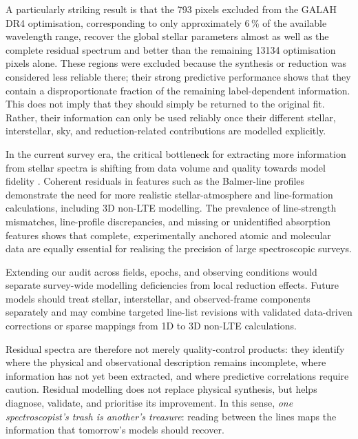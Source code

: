 \documentclass[twocolumn,apj,numberedappendix,appendixfloats]{openjournal}
\begin{document}
A particularly striking result is that the 793 pixels excluded from the GALAH DR4 optimisation, corresponding to only approximately $6\,\mathrm{\%}$ of the available wavelength range, recover the global stellar parameters almost as well as the complete residual spectrum and better than the remaining 13134 optimisation pixels alone. These regions were excluded because the synthesis or reduction was considered less reliable there; their strong predictive performance shows that they contain a disproportionate fraction of the remaining label-dependent information. This does not imply that they should simply be returned to the original fit. Rather, their information can only be used reliably once their different stellar, interstellar, sky, and reduction-related contributions are modelled explicitly.

In the current survey era, the critical bottleneck for extracting more information from stellar spectra is shifting from data volume and quality towards model fidelity \citep{Xiang2019,Saydjari2023,Buder2025b,Storm2026,Casey2026}. Coherent residuals in features such as the Balmer-line profiles demonstrate the need for more realistic stellar-atmosphere and line-formation calculations, including 3D non-LTE modelling. The prevalence of line-strength mismatches, line-profile discrepancies, and missing or unidentified absorption features shows that complete, experimentally anchored atomic and molecular data are equally essential for realising the precision of large spectroscopic surveys.

Extending our audit across fields, epochs, and observing conditions would separate survey-wide modelling deficiencies from local reduction effects. Future models should treat stellar, interstellar, and observed-frame components separately and may combine targeted line-list revisions with validated data-driven corrections or sparse mappings from 1D to 3D non-LTE calculations.

Residual spectra are therefore not merely quality-control products: they identify where the physical and observational description remains incomplete, where information has not yet been extracted, and where predictive correlations require caution. Residual modelling does not replace physical synthesis, but helps diagnose, validate, and prioritise its improvement. In this sense, \textit{one spectroscopist's trash is another's treasure}: reading between the lines maps the information that tomorrow's models should recover.

\end{document}
